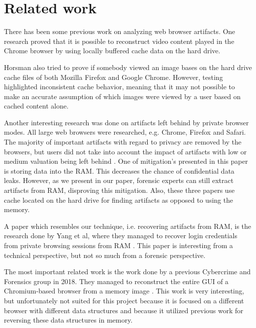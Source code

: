 \section{Related work}
\label{sec:related_work}

There has been some previous work on analyzing web browser
artifacts. One research proved that it is possible to reconstruct
video content played in the Chrome browser by using locally buffered
cache data on the hard drive. \cite{horsman2018reconstructing}

Horsman also tried to prove if somebody viewed an image bases on the
hard drive cache files of both Mozilla Firefox and Google
Chrome. However, testing highlighted inconsistent cache behavior,
meaning that it may not possible to make an accurate assumption of
which images were viewed by a user based on cached content alone.
\cite{horsman2018didn}

Another interesting research was done on artifacts left behind by
private browser modes. All large web browsers were researched,
e.g. Chrome, Firefox and Safari. The majority of important artifacts
with regard to privacy are removed by the browsers, but users did not
take into account the impact of artifacts with low or medium valuation
being left behind \cite{tsalis2017exploring}. One of mitigation's
presented in this paper is storing data into the RAM. This decreases
the chance of confidential data leaks. However, as we present in our
paper, forensic experts can still extract artifacts from RAM,
disproving this mitigation. Also, these three papers use cache located
on the hard drive for finding artifacts as opposed to using the
memory.

A paper which resembles our technique, i.e. recovering artifacts from
RAM, is the research done by Yang et al, where they managed to recover
login credentials from private browsing sessions from RAM
\cite{yang2017applying}. This paper is interesting from a technical
perspective, but not so much from a forensic perspective.

The most important related work is the work done by a previous
Cybercrime and Forensics group in 2018. They managed to reconstruct
the entire GUI of a Chromium-based browser from a memory image
\cite{wikner2018reconstruct}. This work is very interesting, but
unfortunately not suited for this project because it is focused on a
different browser with different data structures and because it
utilized previous work for reversing these data structures in memory.

